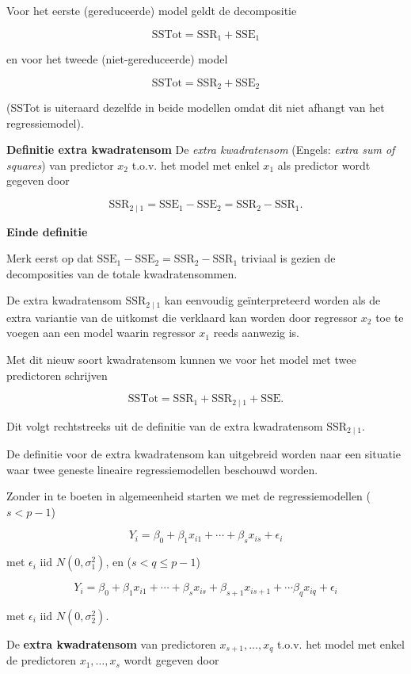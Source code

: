 \documentclass[
  12pt,dutch,coursenotes]{book}
\theoremstyle{definition}
\theoremstyle{definition}
\theoremstyle{definition}
\theoremstyle{remark}
\begin{document}
Voor het eerste (gereduceerde) model geldt de decompositie

\[
  \text{SSTot} = \text{SSR}_1 + \text{SSE}_1
\]

en voor het tweede (niet-gereduceerde) model

\[
  \text{SSTot} = \text{SSR}_2 + \text{SSE}_2
\]

(SSTot is uiteraard dezelfde in beide modellen omdat dit niet afhangt van het regressiemodel).

\textbf{Definitie extra kwadratensom}
De \emph{extra kwadratensom} (Engels: \emph{extra sum of squares}) van predictor \(x_2\) t.o.v. het model met enkel \(x_1\) als predictor wordt gegeven door

\[
  \text{SSR}_{2\mid 1} = \text{SSE}_1-\text{SSE}_2=\text{SSR}_2-\text{SSR}_1.
\]

\textbf{Einde definitie}

Merk eerst op dat \(\text{SSE}_1-\text{SSE}_2=\text{SSR}_2-\text{SSR}_1\) triviaal is gezien de decomposities van de totale kwadratensommen.

De extra kwadratensom \(\text{SSR}_{2\mid 1}\) kan eenvoudig geïnterpreteerd worden als de extra variantie van de uitkomst die verklaard kan worden door regressor \(x_2\) toe te voegen aan een model waarin regressor \(x_1\) reeds aanwezig is.

Met dit nieuw soort kwadratensom kunnen we voor het model met twee predictoren schrijven

\[
  \text{SSTot} = \text{SSR}_1+ \text{SSR}_{2\mid 1} + \text{SSE}.
\]

Dit volgt rechtstreeks uit de definitie van de extra kwadratensom \(\text{SSR}_{2\mid 1}\).

De definitie voor de extra kwadratensom kan uitgebreid worden naar een situatie waar twee geneste lineaire regressiemodellen beschouwd worden.

Zonder in te boeten in algemeenheid starten we met de regressiemodellen (\(s<p-1\))

\[
Y_i = \beta_0 + \beta_1 x_{i1} + \cdots + \beta_{s} x_{is} + \epsilon_i
\]

met \(\epsilon_i\text{ iid }N(0,\sigma_1^{2})\), en (\(s< q\leq p-1\))

\[
Y_i = \beta_0 + \beta_1 x_{i1} + \cdots + \beta_{s} x_{is} + \beta_{s+1} x_{is+1} + \cdots \beta_{q}x_{iq}+ \epsilon_i
\]

met \(\epsilon_i\text{ iid } N(0,\sigma_2^{2})\).

De \textbf{extra kwadratensom} van predictoren \(x_{s+1}, \ldots, x_q\) t.o.v. het model met enkel de predictoren \(x_1,\ldots, x_{s}\) wordt gegeven door
\end{document}
